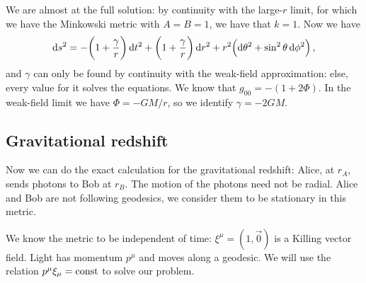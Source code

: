 \documentclass[main.tex]{subfiles}
\begin{document}
We are almost at the full solution: by continuity with the large-\(r\) limit, for which we have the Minkowski metric with \(A = B = 1\), we have that \(k=1\). Now we have 
%
\begin{align}
  \dd{s^2} = - \qty(1 + \frac{\gamma }{r}) \dd{t^2} 
  + \qty(1 + \frac{\gamma}{r}) \dd{r^2}
  + r^2 \qty(\dd{\theta^2} + \sin^2 \theta \dd{\phi^2})
\,,
\end{align}
%
and \(\gamma \) can only be found by continuity with the weak-field approximation: else, every value for it solves the equations. 
We know that \(g_{00} = - (1+2 \Phi )\).
In the weak-field limit we have \(\Phi = -GM/r\), so we identify \(\gamma = - 2GM\).

\subsection{Gravitational redshift}

Now we can do the exact calculation for the gravitational redshift:
Alice, at \(r_A\), sends photons to Bob at \(r_B\). The motion of the photons need not be radial.
Alice and Bob are not following geodesics, we consider them to be stationary in this metric.

We know the metric to be independent of time: \(\xi^{\mu } = (1,\vec{0})\) is a Killing vector field.
Light has momentum \(p^{\mu }\) and moves along a geodesic.
We will use the relation \(p^{\mu } \xi_{\mu } = \text{const}\) to solve our problem.
\end{document}
